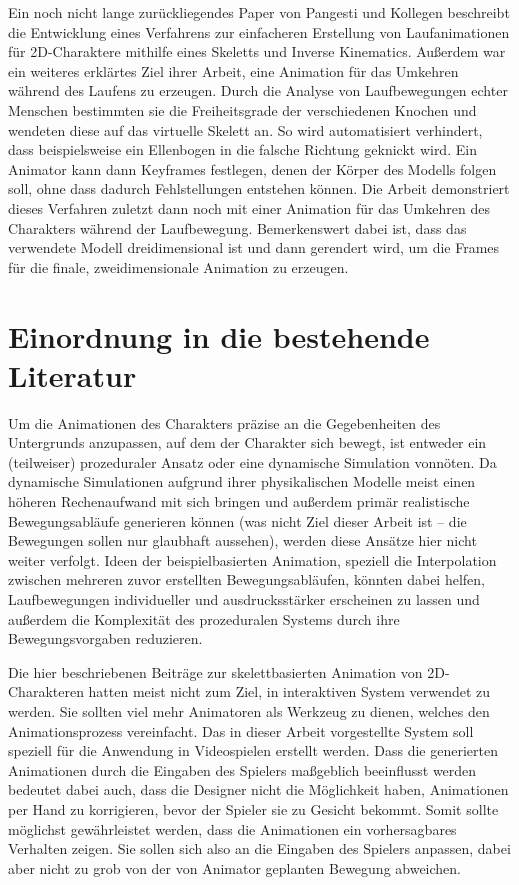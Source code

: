 Ein noch nicht lange zurückliegendes Paper von Pangesti und Kollegen\cite{pangesti2019analysis} beschreibt die Entwicklung eines Verfahrens zur einfacheren Erstellung von Laufanimationen für 2D-Charaktere mithilfe eines Skeletts und Inverse Kinematics. Außerdem war ein weiteres erklärtes Ziel ihrer Arbeit, eine Animation für das Umkehren während des Laufens zu erzeugen. Durch die Analyse von Laufbewegungen echter Menschen bestimmten sie die Freiheitsgrade der verschiedenen Knochen und wendeten diese auf das virtuelle Skelett an. So wird automatisiert verhindert, dass beispielsweise ein Ellenbogen in die falsche Richtung geknickt wird. Ein Animator kann dann Keyframes festlegen, denen der Körper des Modells folgen soll, ohne dass dadurch Fehlstellungen entstehen können. Die Arbeit demonstriert dieses Verfahren zuletzt dann noch mit einer Animation für das Umkehren des Charakters während der Laufbewegung. Bemerkenswert dabei ist, dass das verwendete Modell dreidimensional ist und dann gerendert wird, um die Frames für die finale, zweidimensionale Animation zu erzeugen.


\section{Einordnung in die bestehende Literatur}
Um die Animationen des Charakters präzise an die Gegebenheiten des Untergrunds anzupassen, auf dem der Charakter sich bewegt, ist entweder ein (teilweiser) prozeduraler Ansatz oder eine dynamische Simulation vonnöten. Da dynamische Simulationen aufgrund ihrer physikalischen Modelle meist einen höheren Rechenaufwand mit sich bringen und außerdem primär realistische Bewegungsabläufe generieren können (was nicht Ziel dieser Arbeit ist -- die Bewegungen sollen nur glaubhaft aussehen), werden diese Ansätze hier nicht weiter verfolgt. Ideen der beispielbasierten Animation, speziell die Interpolation zwischen mehreren zuvor erstellten Bewegungsabläufen, könnten dabei helfen, Laufbewegungen individueller und ausdrucksstärker erscheinen zu lassen und außerdem die Komplexität des prozeduralen Systems durch ihre Bewegungsvorgaben reduzieren.

Die hier beschriebenen Beiträge zur skelettbasierten Animation von 2D-Charakteren hatten meist nicht zum Ziel, in interaktiven System verwendet zu werden. Sie sollten viel mehr Animatoren als Werkzeug zu dienen, welches den Animationsprozess vereinfacht. Das in dieser Arbeit vorgestellte System soll speziell für die Anwendung in Videospielen erstellt werden. Dass die generierten Animationen durch die Eingaben des Spielers maßgeblich beeinflusst werden bedeutet dabei auch, dass die Designer nicht die Möglichkeit haben, Animationen per Hand zu korrigieren, bevor der Spieler sie zu Gesicht bekommt. Somit sollte möglichst gewährleistet werden, dass die Animationen ein vorhersagbares Verhalten zeigen. Sie sollen sich also an die Eingaben des Spielers anpassen, dabei aber nicht zu grob von der von Animator geplanten Bewegung abweichen.

